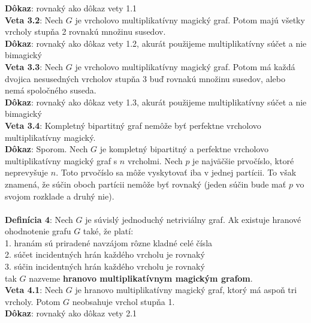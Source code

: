 \documentclass[12pt]{article}
\begin{document}
\textbf{Dôkaz}: rovnaký ako dôkaz vety 1.1 \\

\textbf{Veta 3.2}: Nech $G$ je vrcholovo multiplikatívny magický graf. Potom majú všetky vrcholy stupňa 2 rovnakú množinu susedov. \\

\textbf{Dôkaz}: rovnaký ako dôkaz vety 1.2, akurát použijeme multiplikatívny súčet a nie bimagický \\

\textbf{Veta 3.3}: Nech $G$ je vrcholovo multiplikatívny magický graf. Potom má každá dvojica nesusedných vrcholov stupňa 3 buď rovnakú množinu susedov, alebo nemá spoločného suseda.  \\

\textbf{Dôkaz}: rovnaký ako dôkaz vety 1.3, akurát použijeme multiplikatívny súčet a nie bimagický \\

\textbf{Veta 3.4}: Kompletný bipartitný graf nemôže byť perfektne vrcholovo multiplikatívny magický. \\

\textbf{Dôkaz}: Sporom. Nech $G$ je kompletný bipartitný a perfektne vrcholovo multiplikatívny magický graf s $n$ vrcholmi. Nech $p$ je najväčšie prvočíslo, ktoré neprevyšuje $n$. Toto prvočíslo sa môže vyskytovať iba v jednej partícii. To však znamená, že súčin oboch partícii nemôže byť rovnaký (jeden súčin bude mať $p$ vo svojom rozklade a druhý nie). \\\\

\textbf{Definícia 4}: Nech $G$ je súvislý jednoduchý netriviálny graf. Ak existuje hranové ohodnotenie grafu $G$ také, že platí: \\
1. hranám sú priradené navzájom rôzne kladné celé čísla \\
2. súčet incidentných hrán každého vrcholu je rovnaký \\
3. súčin incidentných hrán každého vrcholu je rovnaký \\
tak $G$ nazveme \textbf{hranovo multiplikatívnym magickým grafom}. \\

\textbf{Veta 4.1}: Nech $G$ je hranovo multiplikatívny magický graf, ktorý má aspoň tri vrcholy. Potom $G$ neobsahuje vrchol stupňa 1. \\

\textbf{Dôkaz}: rovnaký ako dôkaz vety 2.1 \\
\end{document}
